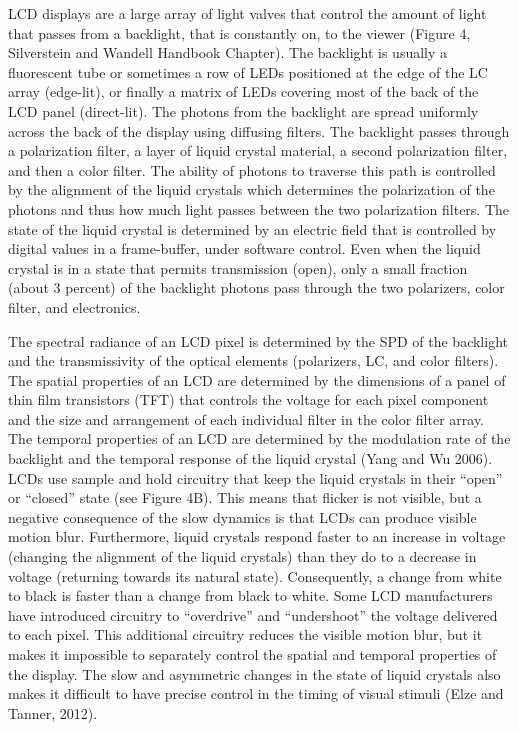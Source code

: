 \documentclass[
  letterpaper,
]{book}
\begin{document}
LCD displays are a large array of light valves that control the amount
of light that passes from a backlight, that is constantly on, to the
viewer (Figure 4, Silverstein and Wandell Handbook Chapter). The
backlight is usually a fluorescent tube or sometimes a row of LEDs
positioned at the edge of the LC array (edge-lit), or finally a matrix
of LEDs covering most of the back of the LCD panel (direct-lit). The
photons from the backlight are spread uniformly across the back of the
display using diffusing filters. The backlight passes through a
polarization filter, a layer of liquid crystal material, a second
polarization filter, and then a color filter. The ability of photons to
traverse this path is controlled by the alignment of the liquid crystals
which determines the polarization of the photons and thus how much light
passes between the two polarization filters. The state of the liquid
crystal is determined by an electric field that is controlled by digital
values in a frame-buffer, under software control. Even when the liquid
crystal is in a state that permits transmission (open), only a small
fraction (about 3 percent) of the backlight photons pass through the two
polarizers, color filter, and electronics.

The spectral radiance of an LCD pixel is determined by the SPD of the
backlight and the transmissivity of the optical elements (polarizers,
LC, and color filters). The spatial properties of an LCD are determined
by the dimensions of a panel of thin film transistors (TFT) that
controls the voltage for each pixel component and the size and
arrangement of each individual filter in the color filter array. The
temporal properties of an LCD are determined by the modulation rate of
the backlight and the temporal response of the liquid crystal (Yang and
Wu 2006). LCDs use sample and hold circuitry that keep the liquid
crystals in their ``open'' or ``closed'' state (see Figure 4B). This
means that flicker is not visible, but a negative consequence of the
slow dynamics is that LCDs can produce visible motion blur. Furthermore,
liquid crystals respond faster to an increase in voltage (changing the
alignment of the liquid crystals) than they do to a decrease in voltage
(returning towards its natural state). Consequently, a change from white
to black is faster than a change from black to white. Some LCD
manufacturers have introduced circuitry to ``overdrive'' and
``undershoot'' the voltage delivered to each pixel. This additional
circuitry reduces the visible motion blur, but it makes it impossible to
separately control the spatial and temporal properties of the display.
The slow and asymmetric changes in the state of liquid crystals also
makes it difficult to have precise control in the timing of visual
stimuli (Elze and Tanner, 2012).
\end{document}
